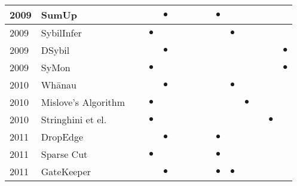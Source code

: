 \begin{table*}[]
\begin{tabular}{||l||l||c|c|c||c|c|c|c|c|c|c|c|c|c||}
  2009 & SumUp~\cite{tran2009sybil}                           &           &           & $\bullet$ &           &           &           &           & $\bullet$ &           &           &           &           &           \\ \hline
  2009 & SybilInfer~\cite{danezis2009sybilinfer}              &           & $\bullet$ &           &           &           &           &           &           & $\bullet$ &           &           &           &           \\ \hline
  2009 & DSybil~\cite{yu2009dsybil}                           &           &           & $\bullet$ &           &           &           &           &           &           &           &           &           & $\bullet$ \\ \hline
  2009 & SyMon~\cite{jyothi2009symon}                         &           & $\bullet$ &           &           &           &           &           &           &           &           &           &           & $\bullet$ \\ \hline
  2010 & Wh\={a}nau~\cite{lesniewski2010whanau}               &           &           & $\bullet$ &           &           &           &           &           & $\bullet$ &           &           &           &           \\ \hline
  2010 & Mislove's Algorithm~\cite{viswanath2010analysis}     &           & $\bullet$ &           &           &           &           &           &           &           & $\bullet$ &           &           &           \\ \hline
  2010 & Stringhini et el.~\cite{stringhini2010detecting}     &           & $\bullet$ &           &           &           &           &           &           &           &           &           & $\bullet$ &           \\ \hline
  2011 & DropEdge~\cite{seuken2011sybil}                      &           &           & $\bullet$ &           &           &           &           & $\bullet$ &           &           &           &           &           \\ \hline
  2011 & Sparse Cut~\cite{kurve2011sybil}                     &           & $\bullet$ &           &           &           &           &           & $\bullet$ &           &           &           &           &           \\ \hline
  2011 & GateKeeper~\cite{tran2011optimal}                    &           &           & $\bullet$ &           &           &           &           & $\bullet$ & $\bullet$ &           &           &           &           \\ \hline

\end{tabular}
\end{table*}
